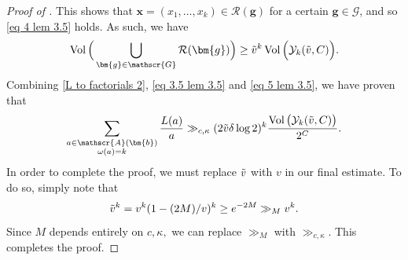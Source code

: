 \documentclass{amsart}
\theoremstyle{definition}
\numberwithin{equation}{section}
\newcommand{\density}{\delta}
\DeclareMathOperator{\Vol}{Vol}
\begin{document}
\begin{proof}[Proof of ]
	 This shows that $\bm{x} = (x_1,\dots, x_k) \in \mathcal{R}(\bm{g})$ for a certain $\bm{g} \in \mathscr{G}$, and so \eqref{eq 4 lem 3.5} holds. As such, we have
	\begin{equation}\label{eq 5 lem 3.5}
		\Vol\Big(\bigcup_{\bm{g} \in \mathscr{G}} \mathcal{R}(\bm{g})\Big) \ge \Tilde{v}^k \Vol\Big( \mathcal{Y}_k(\Tilde{v},C)\Big).
	\end{equation}
	Combining \eqref{L to factorials 2}, \eqref{eq 3.5 lem 3.5} and \eqref{eq 5 lem 3.5}, we have proven that
	$$\sum_{\substack{a \in \mathscr{A}(\bm{b}) \\ \omega(a) = k}} \frac{L(a)}{a} \gg_{c,\kappa} (2 \Tilde{v} \density \log 2)^k\frac{\Vol\big( \mathcal{Y}_k(\Tilde{v},C)\big)}{2^C}.$$
	In order to complete the proof, we must replace $\Tilde{v}$ with $v$ in our final estimate. To do so, simply note that 
	$$\Tilde{v}^k = v^k (1-(2M)/v)^k \geq e^{-2M} \gg_M v^k.$$ 
	Since $M$ depends entirely on $c,\kappa,$ we can replace $\gg_M$ with $\gg_{c,\kappa}$. This completes the proof.
\end{proof}
\end{document}
